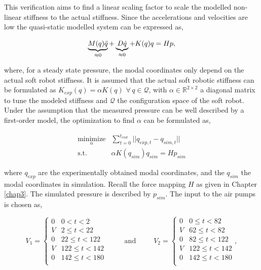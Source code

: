 This verification aims to find a linear scaling factor to scale the modelled non-linear stiffness to the actual stiffness. Since the accelerations and velocities are low the quasi-static modelled system can be expressed as,

\begin{equation}
   \underbrace{M(q) \Ddot{q}}_{\approx 0} + \underbrace{D \dot{q}}_{\approx 0} + K(q) q = Hp,
\end{equation}

where, for a steady state pressure, the modal coordinates only depend on the actual soft robot stiffness. It is assumed that the actual soft robotic stiffness can be formulated as $K_{exp}(q) = \alpha K(q) \hspace{4pt} \forall \hspace{2pt} q \in \mathcal{Q}$, with $\alpha \in \mathbb{R}^{2\times 2}$ a diagonal matrix to tune the modeled stiffness and $\mathcal{Q}$ the configuration space of the soft robot. Under the assumption that the measured pressure can be well described by a first-order model, the optimization to find $\alpha$ can be formulated as, 

\begin{equation}
\begin{split}
    \underset{\alpha}{\text{minimize}}& \sum_{t=0}^{t_{end}}||q_{exp,t} - q_{sim,t}||  \\
    \text{s.t.} \hspace{10pt} & \alpha K(q_{sim}) q_{sim} = Hp_{sim}
    \end{split}
    \label{eq5:optalpha}
\end{equation}

where $q_{exp}$ are the experimentally obtained modal coordinates, and the $q_{sim}$ the modal coordinates in simulation. Recall the force mapping $H$ as given in Chapter \ref{chap3}. The simulated pressure is described by $p_{sim}$. The input to the air pumps is chosen as,

\begin{equation}
    V_1 =
\begin{cases}
0 & 0 < t < 2\\
V & 2 \leq t < 22\\
0 & 22 \leq t < 122\\
V & 122 \leq t < 142\\
0 & 142 \leq t < 180\\
\end{cases} \hspace{30pt} \text{and} \hspace{30pt}      V_2 =
\begin{cases}
0 & 0 \leq t < 82\\
V & 62 \leq t < 82\\
0 & 82 \leq t < 122\\
V & 122 \leq t < 142\\
0 & 142 \leq t < 180\\
\end{cases} ,
\end{equation}

